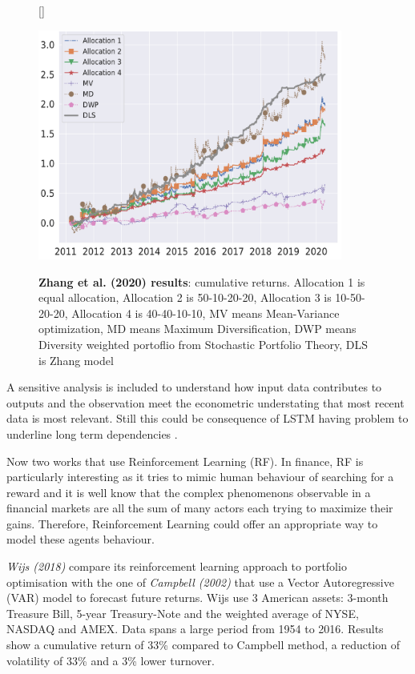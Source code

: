 \begin{figure}
    \centering
    [\FBwidth]
    {\caption[Zhang et.al (2020) results]{\textbf{Zhang et al. (2020) results}: cumulative returns. Allocation 1 is equal allocation, Allocation 2 is 50-10-20-20, Allocation 3 is 10-50-20-20, Allocation 4 is 40-40-10-10, MV means Mean-Variance optimization, MD means Maximum Diversification, DWP means Diversity weighted portoflio from Stochastic Portfolio Theory, DLS is Zhang model}
    \label{fig:zhang_results}}
    {\includegraphics[width=10cm]{cap1/zhang_results.png}}

\end{figure}


A sensitive analysis is included to understand how input data contributes to outputs and the observation meet the econometric understating that most recent data is most relevant. Still this could be consequence of LSTM having problem to underline long term dependencies \cite{vaswani2017attention}.  

\hfill \break

Now two works that use Reinforcement Learning (RF). In finance, RF is particularly interesting as it tries to mimic human behaviour of searching for a reward and it is well know that the complex phenomenons observable in a financial markets are all the sum of many actors each trying to maximize their gains. Therefore, Reinforcement Learning could offer an appropriate way to model these agents behaviour.

\hfill \break

\textit{Wijs (2018)} \cite{weijs2018reinforcement} compare its reinforcement learning approach to portfolio optimisation with the one of \textit{Campbell (2002)}  \cite{campbell2002strategic} that use a Vector Autoregressive (VAR) model to forecast future returns. Wijs use 3 American assets: 3-month Treasure Bill, 5-year Treasury-Note and the weighted average of NYSE, NASDAQ and AMEX. Data spans a large period from 1954 to 2016. Results show a cumulative return of 33\% compared to Campbell method, a reduction of volatility of 33\% and a 3\% lower turnover.

